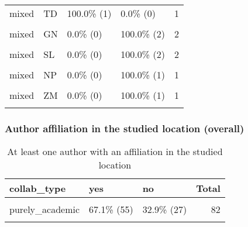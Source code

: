 \documentclass[
]{article}
\begin{document}
\begin{longtable}[t]{llllr}
\addlinespace
mixed & TD & 100.0\%   (1) & 0.0\%  (0) & 1\\
\cellcolor{gray!6}{mixed} & \cellcolor{gray!6}{VE} & \cellcolor{gray!6}{100.0\%   (1)} & \cellcolor{gray!6}{0.0\%  (0)} & \cellcolor{gray!6}{1}\\
mixed & GN & 0.0\%   (0) & 100.0\%  (2) & 2\\
\cellcolor{gray!6}{mixed} & \cellcolor{gray!6}{NG} & \cellcolor{gray!6}{0.0\%   (0)} & \cellcolor{gray!6}{100.0\%  (2)} & \cellcolor{gray!6}{2}\\
mixed & SL & 0.0\%   (0) & 100.0\%  (2) & 2\\
\addlinespace
\cellcolor{gray!6}{mixed} & \cellcolor{gray!6}{HT} & \cellcolor{gray!6}{0.0\%   (0)} & \cellcolor{gray!6}{100.0\%  (1)} & \cellcolor{gray!6}{1}\\
mixed & NP & 0.0\%   (0) & 100.0\%  (1) & 1\\
\cellcolor{gray!6}{mixed} & \cellcolor{gray!6}{YE} & \cellcolor{gray!6}{0.0\%   (0)} & \cellcolor{gray!6}{100.0\%  (1)} & \cellcolor{gray!6}{1}\\
mixed & ZM & 0.0\%   (0) & 100.0\%  (1) & 1\\
\cellcolor{gray!6}{Total} & \cellcolor{gray!6}{-} & \cellcolor{gray!6}{72.6\% (127)} & \cellcolor{gray!6}{27.4\% (48)} & \cellcolor{gray!6}{175}\\*
\end{longtable}
\endgroup{}

\hypertarget{author-affiliation-in-the-studied-location-overall}{%
\subsubsection{Author affiliation in the studied location
(overall)}\label{author-affiliation-in-the-studied-location-overall}}

\begin{table}[H]

\caption{\label{tab:unnamed-chunk-17}At least one author with an affiliation in the studied location}
\centering
\begin{tabular}[t]{lllr}
\toprule
collab\_type & yes & no & Total\\
\midrule
\cellcolor{gray!6}{mixed} & \cellcolor{gray!6}{84.0\%  (63)} & \cellcolor{gray!6}{16.0\% (12)} & \cellcolor{gray!6}{75}\\
purely\_academic & 67.1\%  (55) & 32.9\% (27) & 82\\
\cellcolor{gray!6}{Total} & \cellcolor{gray!6}{75.2\% (118)} & \cellcolor{gray!6}{24.8\% (39)} & \cellcolor{gray!6}{157}\\
\bottomrule
\end{tabular}
\end{table}
\end{document}
